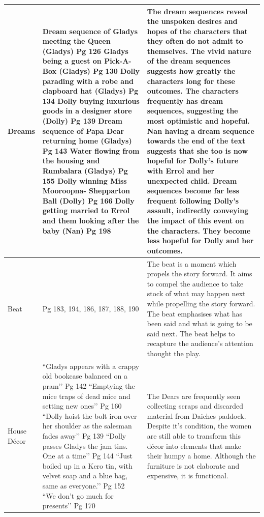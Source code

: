 \documentclass[a4paper]{article}
\begin{document}
\begin{longtable}{|p{2cm}|p{4cm}|p{7cm}|}
Dreams & 
Dream sequence of Gladys meeting the Queen (Gladys) Pg 126 \newline
Gladys being a guest on Pick-A-Box (Gladys) Pg 130 \newline
Dolly parading with a robe and clapboard hat (Gladys) Pg 134 \newline
Dolly buying luxurious goods in a designer store (Dolly) Pg 139 \newline
Dream sequence of Papa Dear returning home (Gladys) Pg 143 \newline
Water flowing from the housing and Rumbalara (Gladys) Pg 155 \newline
Dolly winning Miss Mooroopna- Shepparton Ball (Dolly) Pg 166 \newline
Dolly getting married to Errol and them looking after the baby (Nan) Pg 198 &
The dream sequences reveal the unspoken desires and hopes of the characters that they often do not admit to themselves. The vivid nature of the dream sequences suggests how greatly the characters long for these outcomes. \newline
The characters frequently has dream sequences, suggesting the most optimistic and hopeful. \newline
Nan having a dream sequence towards the end of the text suggests that she too is now hopeful for Dolly’s future with Errol and her unexpected child. Dream sequences become far less frequent following Dolly’s assault, indirectly conveying the impact of this event on the characters. They become less hopeful for Dolly and her outcomes. \\
\hline

Beat & 
Pg 183, 194, 186, 187, 188, 190 &
The beat is a moment which propels the story forward. It aims to compel the audience to take stock of what may happen next while propelling the story forward. The beat emphasises what has been said and what is going to be said next. The beat helps to recapture the audience’s attention thought the play. \\
\hline

House Décor & 
``Gladys appears with a crappy old bookcase balanced on a pram’’ Pg 142 \newline
``Emptying the mice traps of dead mice and setting new ones’’ Pg 160 \newline
``Dolly hoist the bolt iron over her shoulder as the salesman fades away’’ Pg 139 \newline
``Dolly passes Gladys the jam tins. One at a time’’ Pg 144 \newline
``Just boiled up in a Kero tin, with velvet soap and a blue bag, same as everyone.’’ Pg 152 \newline
``We don’t go much for presents’’ Pg 170 &
The Dears are frequently seen collecting scraps and discarded material from Daiches paddock. Despite it’s condition, the women are still able to transform this décor into elements that make their humpy a home. Although the furniture is not elaborate and expensive, it is functional. \\
\hline

\end{longtable}
\end{document}
